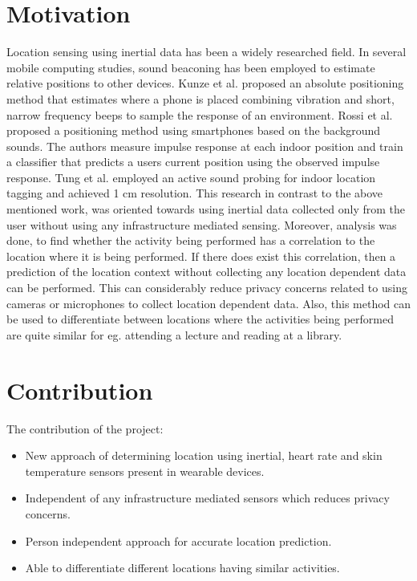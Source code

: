 \documentclass{acm_proc_article-sp}
\begin{document}
\section{Motivation}
Location sensing using inertial data has been a widely researched field. In several mobile computing studies\cite{Constandache:Bob}, sound beaconing has been employed to estimate relative positions to other devices. Kunze et al\cite{Kunze:Ubicomp}. proposed an absolute positioning method that estimates where a phone is placed combining vibration and short, narrow frequency beeps to sample the response of an environment. Rossi et al.\cite{Rossi:2013:RIP:2459236.2459252} proposed a positioning method using smartphones based on the background sounds. The authors measure impulse response at each indoor position and train a classifier that predicts a user\textsc{}s current position using the observed impulse response. Tung et al.\cite{Tung:2015:EAI:2789168.2790102} employed an active sound probing for indoor location tagging and achieved 1 cm resolution. 
This research in contrast to the above mentioned work, was oriented towards using inertial data collected only from the user without using any infrastructure mediated sensing. Moreover, analysis was done, to find whether the activity being performed has a correlation to the location where it is being performed. If there does exist this correlation, then a prediction of the location context without collecting any location dependent data can be performed. This can considerably reduce privacy concerns related to using cameras or microphones to collect location dependent data. Also, this method can be used to differentiate between locations where the activities being performed are quite similar for eg. attending a lecture and reading at a library. 

\section{Contribution}
The contribution of the project:
\begin{itemize}
\item  New approach of determining location using inertial, heart rate and skin temperature sensors present in wearable devices.
\item Independent of any infrastructure mediated sensors which reduces privacy concerns.
\item Person independent approach for accurate location prediction.
\item Able to differentiate different locations having similar activities.
\end{itemize}
\end{document}
